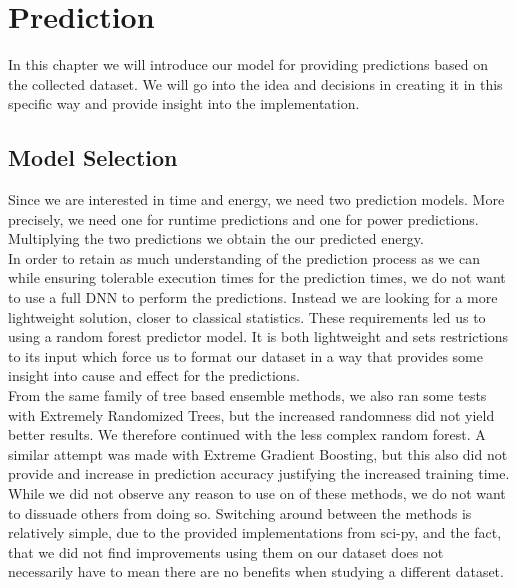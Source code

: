 \chapter{Prediction}\label{chap:contrib2}

In this chapter we will introduce our model for providing predictions based on the collected dataset. We will go into the idea and decisions in creating it in this specific way and provide insight into the implementation.


\section{Model Selection}
Since we are interested in time and energy, we need two prediction models. More precisely, we need one for runtime predictions and one for power predictions. Multiplying the two predictions we obtain the our predicted energy. \\
In order to retain as much understanding of the prediction process as we can while ensuring tolerable execution times for the prediction times, we do not want to use a full DNN to perform the predictions. Instead we are looking for a more lightweight solution, closer to classical statistics. These requirements led us to using a random forest predictor model. It is both lightweight and sets restrictions to its input which force us to format our dataset in a way that provides some insight into cause and effect for the predictions. \\
From the same family of tree based ensemble methods, we also ran some tests with Extremely Randomized Trees, but the increased randomness did not yield better results. We therefore continued with the less complex random forest. A similar attempt was made with Extreme Gradient Boosting, but this also did not provide and increase in prediction accuracy justifying the increased training time. While we did not observe any reason to use on of these methods, we do not want to dissuade others from doing so. Switching around between the methods is relatively simple, due to the provided implementations from sci-py, and the fact, that we did not find improvements using them on our dataset does not necessarily have to mean there are no benefits when studying a different dataset.




